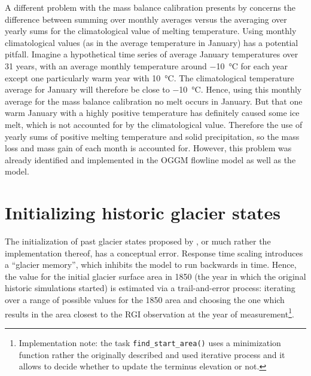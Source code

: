         A different problem with the mass balance calibration presents by \citet{Marzeion2012b} concerns the difference between summing over monthly averages versus the averaging over yearly sums for the climatological value of melting temperature.
        Using monthly climatological values (as in the average temperature in January) has a potential pitfall. Imagine a hypothetical time series of average January temperatures over 31 years, with an average monthly temperature  around \SI{-10}{\celsius} for each year except one particularly warm year with \SI{+10}{\celsius}. The climatological temperature average for January will therefore be close to \SI{-10}{\celsius}. Hence, using this monthly average for the mass balance calibration no melt occurs in January. But that one warm January with a highly positive temperature has definitely caused some ice melt, which is not accounted for by the climatological value. Therefore the use of yearly sums of positive melting temperature and solid precipitation, so the mass loss and mass gain of each month is accounted for. However, this problem was already identified and implemented in the OGGM flowline model as well as the \vas{} model.
    

    \section{Initializing historic glacier states} %
    \label{sec:initializing_historic_glacier_states}

        The initialization of past glacier states proposed by \citet{Marzeion2012b}, or much rather the implementation thereof, has a conceptual error. Response time scaling introduces a ``glacier memory'', which inhibits the model to run backwards in time. Hence, the value for the initial glacier surface area in 1850 (the year in which the original historic simulations started) is estimated via a trail-and-error process: iterating over a range of possible values for the 1850 area and choosing the one which results in the area closest to the RGI observation at the year of measurement\footnote{Implementation note: the task \lstinline`find_start_area()` uses a minimization function rather the originally described and used iterative process and it allows to decide whether to update the terminus elevation or not.}.

